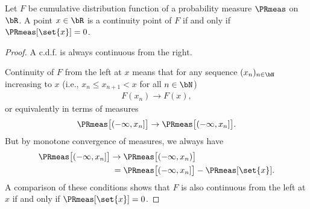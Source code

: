 \begin{lemma}
  \label{lem:cdf-continuity-pt-iff-measure-singleton}
  \leanok
  Let $F$ be cumulative distribution function of a
  probability measure $\PRmeas$ on $\bR$. A point $x \in \bR$ is
  a continuity point of $F$ if and only if $\PRmeas[\set{x}] = 0$.
\end{lemma}
\begin{proof}
  A c.d.f. is always continuous from the right.

  Continuity of $F$ from the left at $x$ means that for any
  sequence $(x_n)_{n \in \bN}$ increasing to $x$
  (i.e., $x_n \le x_{n+1} < x$ for all $n \in \bN$)
  \begin{align*}
    F(x_n) \to F(x) ,
  \end{align*}
  or equivalently in terms of measures
  \begin{align*}
    \PRmeas \big[ (-\infty,x_n] \big] \to \PRmeas \big[ (-\infty,x_n] \big] .
  \end{align*}
  But by monotone convergence of measures, we always have
  \begin{align*}
    \PRmeas \big[ (-\infty,x_n] \big]
    \to \; & \PRmeas \big[ (-\infty,x_n) \big] \\
    = \; & \PRmeas \big[ (-\infty,x_n] \big] - \PRmeas[\set{x}] .
  \end{align*}
  A comparison of these conditions shows that $F$ is also continuous from the left
  at $x$ if and only if $\PRmeas[\set{x}] = 0$.
\end{proof}
